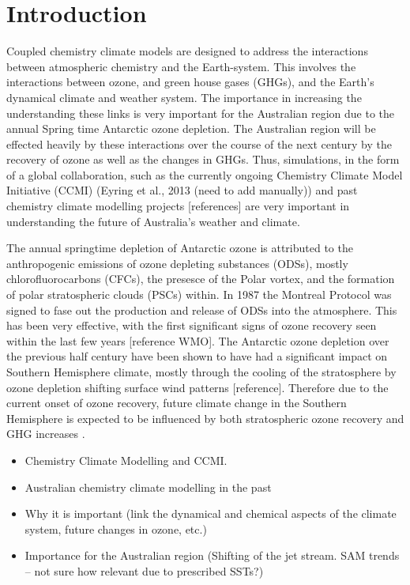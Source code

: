 \section{Introduction} 

Coupled chemistry climate models are designed to address the interactions between atmospheric chemistry and the Earth-system. This involves the interactions between ozone, and green house gases (GHGs), and the Earth's dynamical climate and weather system. The importance in increasing the understanding these links is very important for the Australian region due to the annual Spring time Antarctic ozone depletion. The Australian region will be effected heavily by these interactions over the course of the next century by the recovery of ozone as well as the changes in GHGs. Thus, simulations, in the form of a global collaboration, such as the currently ongoing Chemistry Climate Model Initiative (CCMI) (Eyring et al., 2013 (need to add manually)) and past chemistry climate modelling projects [references] are very important in understanding the future of Australia's weather and climate.

The annual springtime depletion of Antarctic ozone is attributed to the anthropogenic emissions of ozone depleting substances (ODSs), mostly chlorofluorocarbons (CFCs), the presesce of the Polar vortex, and the formation of polar stratospheric clouds (PSCs) within. In 1987 the Montreal Protocol was signed to fase out the production and release of ODSs into the atmosphere. This has been very effective, with the first significant signs of ozone recovery seen within the last few years [reference WMO]. The Antarctic ozone depletion over the previous half century have been shown to have had a significant impact on Southern Hemisphere climate, mostly through the cooling of the stratosphere by ozone depletion shifting surface wind patterns [reference]. Therefore due to the current onset of ozone recovery, future climate change in the Southern Hemisphere is expected to be influenced by both stratospheric ozone recovery and GHG increases \cite{Arblaster_2011}.

\begin{itemize}
\item Chemistry Climate Modelling and CCMI.
\item Australian chemistry climate modelling in the past
\item Why it is important (link the dynamical and chemical aspects of the climate system, future changes in ozone, etc.)
\item Importance for the Australian region (Shifting of the jet stream. SAM trends – not sure how relevant due to prescribed SSTs?)
\end{itemize}